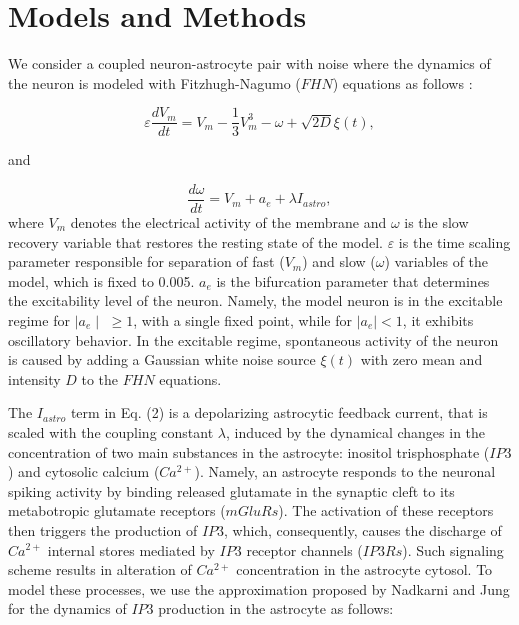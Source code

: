 \documentclass[%
 aip,
 amsmath,amssymb,
 reprint,%
]{revtex4-1}
\begin{document}
\section{Models and Methods} 
	\label{sec:model}
	 We consider a coupled neuron-astrocyte pair with noise where the dynamics of the neuron is modeled with Fitzhugh-Nagumo ($FHN$) equations as follows \cite{FitzHugh1961, Yu2021}:
	
	\begin{equation}
		\varepsilon\frac{dV_{m}}{dt}=V_{m}-\frac{1}{3}V_{m}^{3}-\omega+\sqrt{2D}\xi(t),
	\end{equation}
	
	and
	
	\begin{equation}
		\frac{d\omega}{dt}=V_{m}+a_e+\lambda I_{astro},
	\end{equation}
		\noindent where $V_{m}$ denotes the electrical activity of the membrane and $\omega$ is the slow recovery variable that restores the resting state of the model. $\varepsilon$ is the time scaling parameter responsible for separation of fast ($V_{m}$) and slow ($\omega$) variables of the model, which is fixed to 0.005. $a_{e}$ is the bifurcation parameter that determines the excitability level of the neuron. Namely, the model neuron is in the excitable regime for $\mid a_{e} \mid$ $\geq 1$, with a single fixed point, while for $\mid a_{e} \mid < 1$, it exhibits oscillatory behavior. In the excitable regime, spontaneous activity of the neuron is caused by adding a Gaussian white noise source $\xi(t)$ with zero mean and intensity $D$ to the $FHN$ equations.
	
	The $I_{astro}$ term in Eq. (2) is a depolarizing astrocytic feedback current, that is scaled with the coupling constant $\lambda$, induced by the dynamical changes in the concentration of two main substances in the astrocyte: inositol trisphosphate ($IP3$) and cytosolic calcium ($Ca^{2+}$). Namely, an astrocyte responds to the neuronal spiking activity by binding released glutamate in the synaptic cleft to its metabotropic glutamate receptors ($mGluRs$). The activation of these receptors then triggers the production of $IP3$, which, consequently, causes the discharge of $Ca^{2+}$ internal stores mediated by $IP3$ receptor channels ($IP3Rs$). Such signaling scheme results in alteration of $Ca^{2+}$ concentration in the astrocyte cytosol. To model these processes, we use the approximation proposed by Nadkarni and Jung \cite{nadkarni2003} for the dynamics of $IP3$ production in the astrocyte as follows:
	
\end{document}
